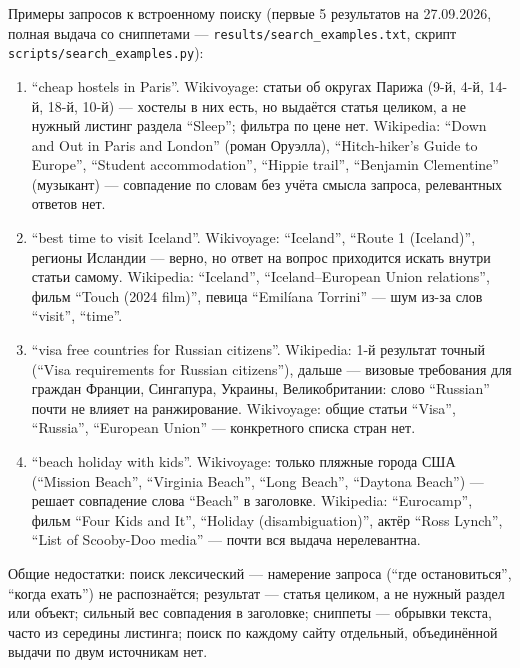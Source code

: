Примеры запросов к встроенному поиску (первые 5 результатов на 27.09.2026, полная выдача со сниппетами --- \texttt{results/search\_examples.txt}, скрипт \texttt{scripts/search\_examples.py}):

\begin{enumerate}
\item \enquote{cheap hostels in Paris}.
Wikivoyage: статьи об округах Парижа (9-й, 4-й, 14-й, 18-й, 10-й) --- хостелы в них есть, но выдаётся статья целиком, а не нужный листинг раздела \enquote{Sleep}; фильтра по цене нет.
Wikipedia: \enquote{Down and Out in Paris and London} (роман Оруэлла), \enquote{Hitch-hiker's Guide to Europe}, \enquote{Student accommodation}, \enquote{Hippie trail}, \enquote{Benjamin Clementine} (музыкант) --- совпадение по словам без учёта смысла запроса, релевантных ответов нет.

\item \enquote{best time to visit Iceland}.
Wikivoyage: \enquote{Iceland}, \enquote{Route 1 (Iceland)}, регионы Исландии --- верно, но ответ на вопрос приходится искать внутри статьи самому.
Wikipedia: \enquote{Iceland}, \enquote{Iceland–European Union relations}, фильм \enquote{Touch (2024 film)}, певица \enquote{Emilíana Torrini} --- шум из-за слов \enquote{visit}, \enquote{time}.

\item \enquote{visa free countries for Russian citizens}.
Wikipedia: 1-й результат точный (\enquote{Visa requirements for Russian citizens}), дальше --- визовые требования для граждан Франции, Сингапура, Украины, Великобритании: слово \enquote{Russian} почти не влияет на ранжирование.
Wikivoyage: общие статьи \enquote{Visa}, \enquote{Russia}, \enquote{European Union} --- конкретного списка стран нет.

\item \enquote{beach holiday with kids}.
Wikivoyage: только пляжные города США (\enquote{Mission Beach}, \enquote{Virginia Beach}, \enquote{Long Beach}, \enquote{Daytona Beach}) --- решает совпадение слова \enquote{Beach} в заголовке.
Wikipedia: \enquote{Eurocamp}, фильм \enquote{Four Kids and It}, \enquote{Holiday (disambiguation)}, актёр \enquote{Ross Lynch}, \enquote{List of Scooby-Doo media} --- почти вся выдача нерелевантна.
\end{enumerate}

Общие недостатки: поиск лексический --- намерение запроса (\enquote{где остановиться}, \enquote{когда ехать}) не распознаётся; результат --- статья целиком, а не нужный раздел или объект; сильный вес совпадения в заголовке; сниппеты --- обрывки текста, часто из середины листинга; поиск по каждому сайту отдельный, объединённой выдачи по двум источникам нет.


